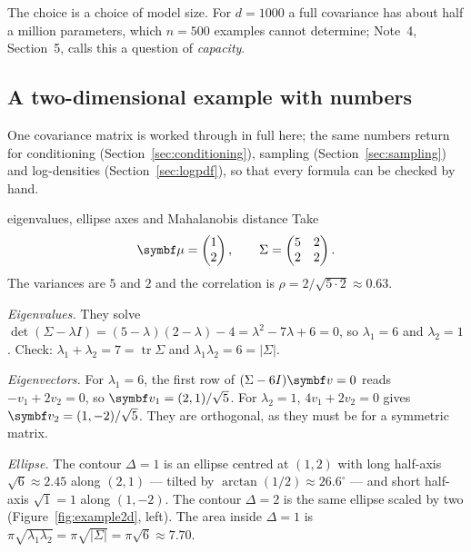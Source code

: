 \documentclass[11pt]{article}
\begin{document}
The choice is a choice of model size. For $d = 1000$ a full covariance has about half a million parameters, which
$n = 500$ examples cannot determine; Note~4, Section~5, calls this a question of \emph{capacity}.

\subsection{A two-dimensional example with numbers}\label{sec:example2d}

One covariance matrix is worked through in full here; the same numbers return for conditioning
(Section~\ref{sec:conditioning}), sampling (Section~\ref{sec:sampling}) and log-densities
(Section~\ref{sec:logpdf}), so that every formula can be checked by hand.

\begin{worked}{eigenvalues, ellipse axes and Mahalanobis distance}
Take
\[
  \vmu = \begin{pmatrix} 1 \\ 2 \end{pmatrix}, \qquad
  \Sigma = \begin{pmatrix} 5 & 2 \\ 2 & 2 \end{pmatrix}.
\]
The variances are $5$ and $2$ and the correlation is $\rho = 2/\sqrt{5 \cdot 2} \approx 0.63$.

\emph{Eigenvalues.} They solve $\det(\Sigma - \lambda I) = (5 - \lambda)(2 - \lambda) - 4 = \lambda^2 - 7\lambda + 6
= 0$, so $\lambda_1 = 6$ and $\lambda_2 = 1$. Check: $\lambda_1 + \lambda_2 = 7 = \operatorname{tr}\Sigma$ and
$\lambda_1\lambda_2 = 6 = \lvert\Sigma\rvert$.

\emph{Eigenvectors.} For $\lambda_1 = 6$, the first row of $(\Sigma - 6I)\vect{v} = 0$ reads $-v_1 + 2v_2 = 0$, so
$\vect{v}_1 = (2, 1)/\sqrt5$. For $\lambda_2 = 1$, $4v_1 + 2v_2 = 0$ gives $\vect{v}_2 = (1, -2)/\sqrt5$. They are
orthogonal, as they must be for a symmetric matrix.

\emph{Ellipse.} The contour $\Delta = 1$ is an ellipse centred at $(1, 2)$ with long half-axis $\sqrt6 \approx 2.45$
along $(2, 1)$ --- tilted by $\arctan(1/2) \approx 26.6^\circ$ --- and short half-axis $\sqrt1 = 1$ along $(1, -2)$.
The contour $\Delta = 2$ is the same ellipse scaled by two (Figure~\ref{fig:example2d}, left). The area inside
$\Delta = 1$ is $\pi\sqrt{\lambda_1\lambda_2} = \pi\sqrt{\lvert\Sigma\rvert} = \pi\sqrt6 \approx 7.70$.


\end{worked}
\end{document}
